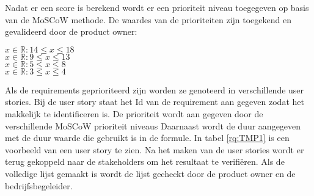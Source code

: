 \whitespace
Nadat er een score is berekend wordt er een prioriteit niveau toegegeven op basis van de MoSCoW methode.
De waardes van de prioriteiten zijn toegekend en gevalideerd door de product owner:

\whitespace
{} $ x \in \mathbb{R} : 14 \leq x \leq 18 $ \\
 $ x \in \mathbb{R} : 9 \leq x \leq 13 $ \\
 $ x \in \mathbb{R} :  5 \leq x \leq 8 $ \\
 $ x \in \mathbb{R} : 3 \leq x \leq 4 $

\whitespace
Als de requirements geprioriteerd zijn worden ze genoteerd in verschillende user stories.
Bij de user story staat het Id van de requirement aan gegeven zodat het makkelijk te identificeren is.
De prioriteit wordt aan gegeven door de verschillende MoSCoW prioriteit niveaus
Daarnaast wordt de duur aangegeven met de duur waarde die gebruikt is in de formule.
In tabel \ref{rq:TMP1} is een voorbeeld van een user story te zien.
Na het maken van de user stories wordt er terug gekoppeld naar de stakeholders om het resultaat te verifiëren.
Als de volledige lijst gemaakt is wordt de lijst gecheckt door de product owner en de bedrijfsbegeleider.


